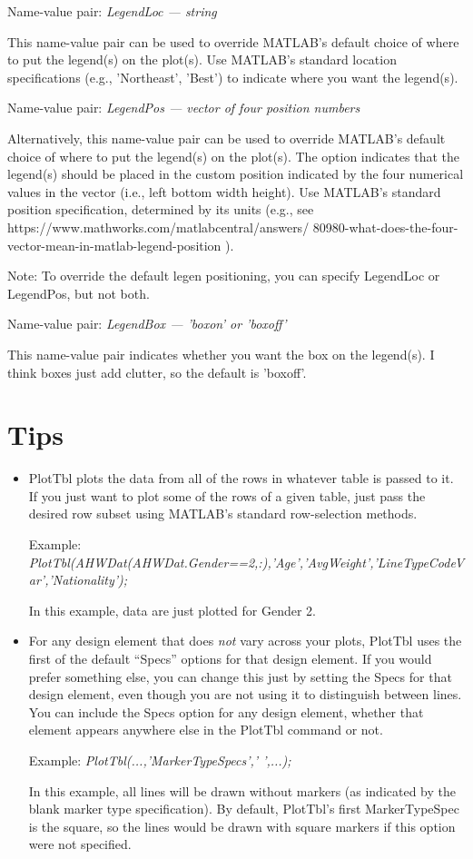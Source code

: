 \documentclass{article}
\newcommand{\example}[1]{Example: {\it #1}}
\newcommand{\namevalue}[2]{{\it #1 --- #2}}
\begin{document}
Name-value pair: \namevalue{LegendLoc}{string}

This name-value pair can be used to override MATLAB's default choice of where to
put the legend(s) on the plot(s).
Use MATLAB's standard location specifications (e.g., 'Northeast', 'Best')
to indicate where you want the legend(s).

Name-value pair: \namevalue{LegendPos}{vector of four position numbers}

Alternatively, this name-value pair can be used to override MATLAB's default choice of where to
put the legend(s) on the plot(s).
The option indicates that the legend(s) should be placed in the custom position
indicated by the four numerical values in the vector (i.e., left bottom width height).
Use MATLAB's standard position specification, determined by its units
(e.g., see https://www.mathworks.com/matlabcentral/answers/ 80980-what-does-the-four-vector-mean-in-matlab-legend-position ).

Note: To override the default legen positioning, you can specify LegendLoc or LegendPos, but not both.

Name-value pair: \namevalue{LegendBox}{'boxon' or 'boxoff'}

This name-value pair indicates whether you want the box on the legend(s).
I think boxes just add clutter, so the default is 'boxoff'.

\section{Tips}

\begin{itemize}

\item PlotTbl plots the data from all of the rows in whatever table
is passed to it.
If you just want to plot some of the rows of a given table, just pass
the desired row subset using MATLAB's standard row-selection methods.

\example{PlotTbl(AHWDat(AHWDat.Gender==2,:),'Age','AvgWeight','LineTypeCodeVar','Nationality');} 

In this example, data are just plotted for Gender 2.

\item For any design element that does \emph{not} vary across your plots,
PlotTbl uses the first of the default ``Specs'' options for that design element.
If you would prefer something else, you can change this just by setting the Specs
for that design element, even though you are not using it to distinguish between lines.
You can include the Specs option for any design element, whether that element appears
anywhere else in the PlotTbl command or not.

\example{PlotTbl(...,'MarkerTypeSpecs',' ',...);} 

In this example, all lines will be drawn without markers (as indicated by the blank marker type specification).
By default, PlotTbl's first MarkerTypeSpec is the square, so the lines would be drawn with square
markers if this option were not specified.

\end{itemize}
\end{document}
